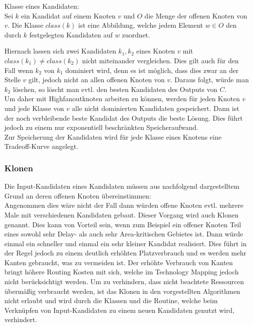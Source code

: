 \documentclass[11pt, a4paper, german]{article}
\newcommand{\TM}{Technology  Mapping }
\begin{document}
\begin{definition}{Klasse eines Kandidaten:}\\
	Sei $k$ ein Kandidat auf einem Knoten $v$ und $O$ die Menge der offenen Knoten von $v$. Die Klasse $class(k)$ ist eine Abbildung, welche jedem Element $w \in O$ den durch $k$ festgelegten Kandidaten auf $w$ zuordnet.
\end{definition}
Hiernach lassen sich zwei Kandidaten $k_1,k_2$ eines Knoten $v$ mit $class(k_1) \neq class(k_2)$ nicht miteinander vergleichen. Dies gilt auch für den Fall wenn $k_2$ von  $k_1$ dominiert wird, denn es ist möglich, dass dies zwar an der Stelle $v$ gilt, jedoch nicht an allen offenen Knoten von $v$. Daraus folgt, würde man $k_2$ löschen, so löscht man evtl. den besten Kandidaten des Outputs von $C$. \\
Um daher mit Highfanoutknoten arbeiten zu können, werden für jeden Knoten $v$ und jede Klasse von $v$ alle nicht dominierten Kandidaten gespeichert. Dann ist der noch verbleibende beste Kandidat des Outputs die beste Lösung. Dies führt jedoch zu einem nur exponentiell beschränkten Speicheraufwand.\\
Zur Speicherung der Kandidaten wird für jede Klasse eines Knotens eine Tradeoff-Kurve angelegt.

\subsubsection{Klonen}\label{subsubsec:klonen}
Die Input-Kandidaten eines Kandidaten müssen aus nachfolgend dargestelltem Grund an deren offenen Knoten übereinstimmen:\\
Angenommen dies wäre nicht der Fall dann würden offene Knoten evtl. mehrere Male mit verschiedenen Kandidaten gebaut. Dieser Vorgang wird auch Klonen genannt. Dies kann von Vorteil sein, wenn zum Beispiel ein offener Knoten Teil eines sowohl sehr Delay- als auch sehr Area-kritischen Gebietes ist. Dann würde einmal ein schneller und einmal ein sehr kleiner Kandidat realisiert. Dies führt in der Regel jedoch zu einem deutlich erhöhten Platzverbrauch und es werden mehr Kanten gebraucht, was zu vermeiden ist. Der erhöhte Verbrauch von Kanten bringt höhere Routing Kosten mit sich, welche im \TM jedoch nicht berücksichtigt werden. Um zu verhindern, dass nicht beachtete Ressourcen übermäßig verbraucht werden, ist das Klonen in den vorgestellten Algorithmen nicht erlaubt und wird durch die Klassen und die Routine, welche beim Verknüpfen von Input-Kandidaten zu einem neuen Kandidaten genutzt wird, verhindert. 
\end{document}

